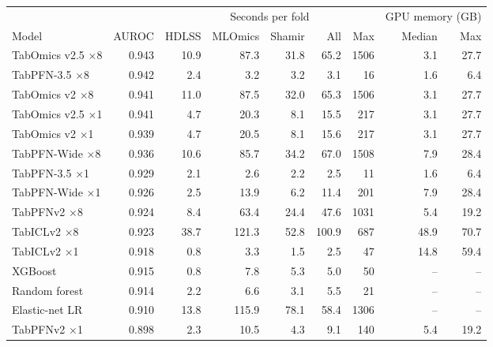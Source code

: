 \begin{tabular}{lrrrrrrrr}
\toprule
 & & \multicolumn{5}{c}{Seconds per fold} & \multicolumn{2}{c}{GPU memory (GB)} \\
\cmidrule(lr){3-7} \cmidrule(lr){8-9}
Model & AUROC & HDLSS & MLOmics & Shamir & All & Max & Median & Max \\
\midrule
TabOmics v2.5 $\times$8 & 0.943 & 10.9 & 87.3 & 31.8 & 65.2 & 1506 & 3.1 & 27.7 \\
TabPFN-3.5 $\times$8 & 0.942 & 2.4 & 3.2 & 3.2 & 3.1 & 16 & 1.6 & 6.4 \\
TabOmics v2 $\times$8 & 0.941 & 11.0 & 87.5 & 32.0 & 65.3 & 1506 & 3.1 & 27.7 \\
TabOmics v2.5 $\times$1 & 0.941 & 4.7 & 20.3 & 8.1 & 15.5 & 217 & 3.1 & 27.7 \\
TabOmics v2 $\times$1 & 0.939 & 4.7 & 20.5 & 8.1 & 15.6 & 217 & 3.1 & 27.7 \\
TabPFN-Wide $\times$8 & 0.936 & 10.6 & 85.7 & 34.2 & 67.0 & 1508 & 7.9 & 28.4 \\
TabPFN-3.5 $\times$1 & 0.929 & 2.1 & 2.6 & 2.2 & 2.5 & 11 & 1.6 & 6.4 \\
TabPFN-Wide $\times$1 & 0.926 & 2.5 & 13.9 & 6.2 & 11.4 & 201 & 7.9 & 28.4 \\
TabPFNv2 $\times$8 & 0.924 & 8.4 & 63.4 & 24.4 & 47.6 & 1031 & 5.4 & 19.2 \\
TabICLv2 $\times$8 & 0.923 & 38.7 & 121.3 & 52.8 & 100.9 & 687 & 48.9 & 70.7 \\
TabICLv2 $\times$1 & 0.918 & 0.8 & 3.3 & 1.5 & 2.5 & 47 & 14.8 & 59.4 \\
XGBoost & 0.915 & 0.8 & 7.8 & 5.3 & 5.0 & 50 & -- & -- \\
Random forest & 0.914 & 2.2 & 6.6 & 3.1 & 5.5 & 21 & -- & -- \\
Elastic-net LR & 0.910 & 13.8 & 115.9 & 78.1 & 58.4 & 1306 & -- & -- \\
TabPFNv2 $\times$1 & 0.898 & 2.3 & 10.5 & 4.3 & 9.1 & 140 & 5.4 & 19.2 \\
\bottomrule
\end{tabular}
